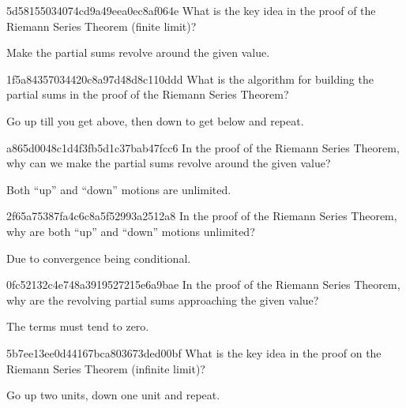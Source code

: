\begin{note}{5d58155034074cd9a49eea0ec8af064e}
    What is the key idea in the proof of the Riemann Series Theorem (finite limit)?

    \begin{cloze}{1}
        Make the partial sums revolve around the given value.
    \end{cloze}
\end{note}

\begin{note}{1f5a84357034420c8a97d48d8c110ddd}
    What is the algorithm for building the partial sums in the proof of the Riemann Series Theorem?

    \begin{cloze}{1}
        Go up till you get above, then down to get below and repeat.
    \end{cloze}
\end{note}

\begin{note}{a865d0048c1d4f3fb5d1c37bab47fcc6}
    In the proof of the Riemann Series Theorem, why can we make the partial sums revolve around the given value?

    \begin{cloze}{1}
        Both ``up'' and ``down'' motions are unlimited.
    \end{cloze}
\end{note}

\begin{note}{2f65a75387fa4c6c8a5f52993a2512a8}
    In the proof of the Riemann Series Theorem, why are both ``up'' and ``down'' motions unlimited?

    \begin{cloze}{1}
        Due to convergence being conditional.
    \end{cloze}
\end{note}

\begin{note}{0fc52132c4e748a3919527215e6a9bae}
    In the proof of the Riemann Series Theorem, why are the revolving partial sums approaching the given value?

    \begin{cloze}{1}
        The terms must tend to zero.
    \end{cloze}
\end{note}

\begin{note}{5b7ee13ee0d44167bca803673ded00bf}
    What is the key idea in the proof on the Riemann Series Theorem (infinite limit)?

    \begin{cloze}{1}
        Go up two units, down one unit and repeat.
    \end{cloze}
\end{note}

